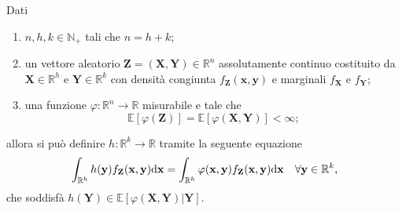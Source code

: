         \begin{prp}
            \label{prpAttesaCondizionataInterpretazionePratica}
            Dati

            \begin{enumerate}[
                label=\arabic*.,
                topsep=0.5em,
                parsep=0em,
                itemsep=0.25em,
                leftmargin=2em,
                rightmargin=1.5em,
            ]
                \item \(n,h,k\in\mathbb N_+\) tali che \(n=h+k\);
                \item un vettore aleatorio \(\mathbf Z=(\mathbf X,\mathbf Y)\in\mathbb R^n\) assolutamente continuo costituito da \(\mathbf X\in\mathbb R^h\) e \(\mathbf Y\in\mathbb R^k\) con densità congiunta \(f_{\mathbf Z}(\mathbf x,\mathbf y)\) e marginali \(f_{\mathbf X}\) e \(f_{\mathbf Y}\);
                \item una funzione \(\varphi\colon\mathbb R^n\to\mathbb R\) misurabile e tale che \[\mathbb E[\varphi(\mathbf Z)]=\mathbb E[\varphi(\mathbf X,\mathbf Y)]<\infty;\]
            \end{enumerate}

            allora si può definire \(h\colon\mathbb R^k\to\mathbb R\) tramite la seguente equazione
            \begin{equation}
                \label{eqCondizionehVettoreAleatorio}
                \int_{\mathbb R^h}h(\mathbf y)f_{\mathbf Z}(\mathbf x,\mathbf y)\mathrm{d}\mathbf x
                =\int_{\mathbb R^h}\varphi(\mathbf x,\mathbf y)f_{\mathbf Z}(\mathbf x,\mathbf y)\mathrm{d}\mathbf x
                \quad\forall\mathbf y\in\mathbb R^k,
            \end{equation}
            che soddisfà \(h(\mathbf Y)\in\mathbb E[\varphi(\mathbf X,\mathbf Y)|\mathbf Y]\).
        \end{prp}
        
